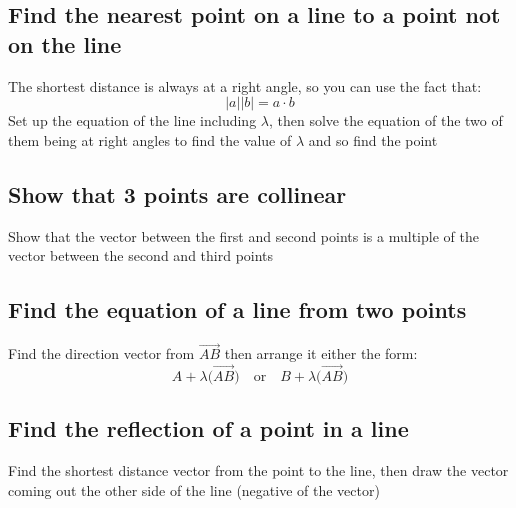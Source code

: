 \documentclass{article}[18pt]
\begin{document}
\subsection{Find the nearest point on a line to a point not on the line}
The shortest distance is always at a right angle, so you can use the fact that:
$$|a||b|=a\cdot b$$
Set up the equation of the line including $\lambda$, then solve the equation of the two of them being at right angles to find the value of $\lambda$ and so find the point
\subsection{Show that 3 points are collinear}
Show that the vector between the first and second points is a multiple of the vector between the second and third points
\subsection{Find the equation of a line from two points}
Find the direction vector from $\overrightarrow{AB}$ then arrange it either the form:
$$A+\lambda\Big(\overrightarrow{AB}\Big) \quad \textrm{or} \quad B+\lambda\Big(\overrightarrow{AB}\Big)$$
\subsection{Find the reflection of a point in a line}
Find the shortest distance vector from the point to the line, then draw the vector coming out the other side of the line (negative of the vector)
\end{document}
